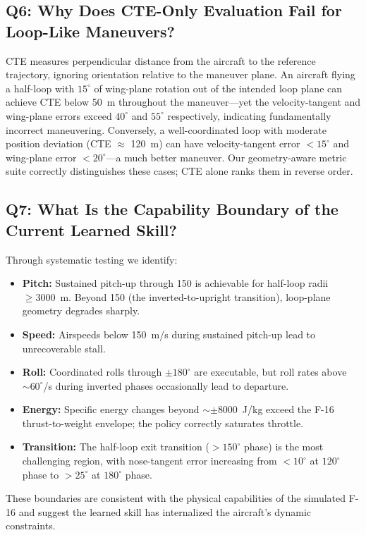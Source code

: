\documentclass{article}
\begin{document}
\subsection{Q6: Why Does CTE-Only Evaluation Fail for Loop-Like Maneuvers?}

CTE measures perpendicular distance from the aircraft to the reference trajectory, ignoring orientation relative to the maneuver plane.
An aircraft flying a half-loop with $15^\circ$ of wing-plane rotation out of the intended loop plane can achieve CTE below 50~m throughout the maneuver---yet the velocity-tangent and wing-plane errors exceed $40^\circ$ and $55^\circ$ respectively, indicating fundamentally incorrect maneuvering.
Conversely, a well-coordinated loop with moderate position deviation (CTE $\approx$ 120~m) can have velocity-tangent error $<15^\circ$ and wing-plane error $<20^\circ$---a much better maneuver.
Our geometry-aware metric suite correctly distinguishes these cases; CTE alone ranks them in reverse order.

\subsection{Q7: What Is the Capability Boundary of the Current Learned Skill?}

Through systematic testing we identify:
\begin{itemize}
  \item \textbf{Pitch:} Sustained pitch-up through 150\textdegree{} is achievable for half-loop radii $\geq 3000$~m. Beyond 150\textdegree{} (the inverted-to-upright transition), loop-plane geometry degrades sharply.
  \item \textbf{Speed:} Airspeeds below 150~m/s during sustained pitch-up lead to unrecoverable stall.
  \item \textbf{Roll:} Coordinated rolls through $\pm180^\circ$ are executable, but roll rates above $\sim60^\circ$/s during inverted phases occasionally lead to departure.
  \item \textbf{Energy:} Specific energy changes beyond $\sim\pm8000$~J/kg exceed the F-16 thrust-to-weight envelope; the policy correctly saturates throttle.
  \item \textbf{Transition:} The half-loop exit transition ($>150^\circ$ phase) is the most challenging region, with nose-tangent error increasing from $<10^\circ$ at $120^\circ$ phase to $>25^\circ$ at $180^\circ$ phase.
\end{itemize}

These boundaries are consistent with the physical capabilities of the simulated F-16 and suggest the learned skill has internalized the aircraft's dynamic constraints.
\end{document}
